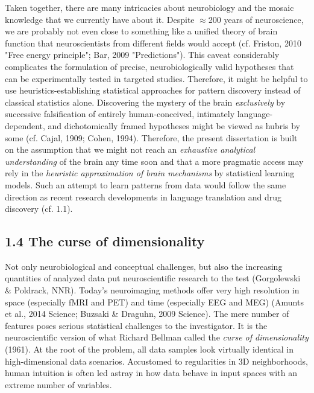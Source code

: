 \documentclass[authoryear,review,3p]{elsarticle}
\begin{document}
Taken together,
there are many intricacies about neurobiology and 
the mosaic knowledge that we currently have about it.
%
Despite $\approx$200 years of neuroscience,
we are probably not even close to something like a unified theory of
brain function
that neuroscientists from different fields would accept
(cf. Friston, 2010 "Free energy principle"; Bar, 2009 "Predictions").
This caveat considerably complicates
the formulation of precise, neurobiologically
valid hypotheses that can be experimentally tested in targeted studies.
%
Therefore, it might be helpful to use heuristics-establishing
statistical approaches for pattern discovery instead of
classical statistics alone.
%
Discovering the mystery of the brain \textit{exclusively} by
successive falsification of
entirely human-conceived,
intimately language-dependent,
and dichotomically framed hypotheses
might be viewed as hubris by some
(cf. Cajal, 1909; Cohen, 1994).
%
Therefore,
the present dissertation is built on the assumption that
we might not reach an \textit{exhaustive analytical understanding}
of the brain any time soon
and that a more pragmatic access
may rely in the \textit{heuristic
approximation of brain mechanisms} by statistical learning models.
%
Such an attempt to learn patterns from data
would follow the same
direction as recent research developments in
language translation and drug discovery (cf. 1.1).



\subsection*{1.4 The curse of dimensionality}
Not only neurobiological and conceptual challenges,
but also the increasing quantities of analyzed data
put neuroscientific research to the test
(Gorgolewski \& Poldrack, NNR).
%
Today's neuroimaging methods offer very high resolution in
space (especially fMRI and PET)
and
time (especially EEG and MEG)
(Amunts et al., 2014 Science; Buzsaki \& Draguhn, 2009 Science).
%
The mere number of features poses serious
statistical challenges to the investigator.
It is the neuroscientific version of what Richard Bellman
called the \textit{curse of dimensionality} (1961).
%
At the root of the problem,
all data samples look virtually identical
in high-dimensional data scenarios.
%
Accustomed to regularities in 3D neighborhoods,
human intuition is often led astray in
how data behave in
input spaces with an extreme number of variables.
\end{document}
